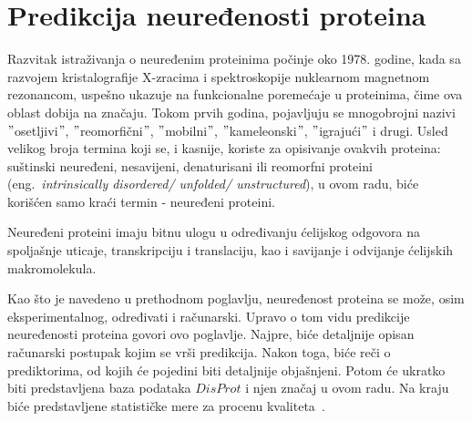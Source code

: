 
\chapter{Predikcija neuređenosti proteina} %
\label{predikcija} %

Razvitak istraživanja o neuređenim proteinima počinje oko 1978. godine, kada sa razvojem kristalografije X-zracima i spektroskopije nuklearnom magnetnom rezonancom, uspešno ukazuje na funkcionalne poremećaje u proteinima, čime ova oblast dobija na značaju. Tokom prvih godina, pojavljuju se mnogobrojni nazivi $"$osetljivi$"$, $"$reomorfični$"$, $"$mobilni$"$, $"$kameleonski$"$, $"$igrajući$"$ i drugi. Usled velikog broja termina koji se, i kasnije, koriste za opisivanje ovakvih proteina: suštinski neuređeni, nesavijeni, denaturisani ili reomorfni proteini (eng.~{\em intrinsically disordered/ unfolded/ unstructured}), u ovom radu, biće korišćen samo kraći termin - neuređeni proteini. 

Neuređeni proteini imaju bitnu ulogu u određivanju ćelijskog odgovora na spoljašnje uticaje, transkripciju i translaciju, kao i savijanje i odvijanje ćelijskih makromolekula.

Kao što je navedeno u prethodnom poglavlju, neuređenost proteina se može, osim eksperimentalnog, određivati i računarski. Upravo o tom vidu predikcije neuređenosti proteina govori ovo poglavlje. Najpre, biće detaljnije opisan računarski postupak kojim se vrši predikcija. Nakon toga, biće reči o prediktorima, od kojih će pojedini biti detaljnije objašnjeni. Potom će ukratko biti predstavljena baza podataka $DisProt$ i njen značaj u ovom radu. Na kraju biće predstavljene statističke mere za procenu kvaliteta~\cite{JKd, IDPsAtoZ, IDPTompa}.\\



